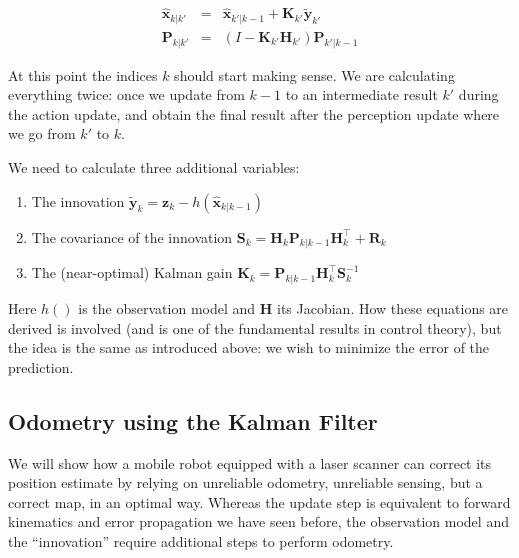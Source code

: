 \begin{eqnarray}
\hat{\boldsymbol{x}}_{k|k'} &=& \hat{\boldsymbol{x}}_{k'|k-1} + \boldsymbol{K}_{k'}\tilde{\boldsymbol{y}}_{k'}\\
\boldsymbol{P}_{k|k'} &=& (I - \boldsymbol{K}_{k'} {\boldsymbol{H}_{k'}}) \boldsymbol{P}_{k'|k-1}
\end{eqnarray}

At this point the indices $ k$ should start making sense. We are calculating everything twice: once we update from $ k-1$ to an intermediate result $ k'$ during the action update, and obtain the final result after the perception update where we go from $ k'$ to $ k$.

We need to calculate three additional variables:
\begin{enumerate}
\item The innovation $ \tilde{\boldsymbol{y}}_{k}=\boldsymbol{z}_{k}-h(\hat{\boldsymbol{x}}_{k|k-1})$
\item The covariance of the innovation $\boldsymbol{S}_{k}={\boldsymbol{H}_{k}}\boldsymbol{P}_{k|k-1}{\boldsymbol{H}_{k}^\top}+\boldsymbol{R}_{k}$
\item The (near-optimal)  Kalman gain $ \boldsymbol{K}_{k}=\boldsymbol{P}_{k|k-1}{\boldsymbol{H}_{k}^\top}\boldsymbol{S}_{k}^{-1}$
\end{enumerate}
Here $ h()$ is the observation model and $ \boldsymbol{H}$ its Jacobian. How these equations are derived is involved (and is one of the fundamental results in control theory), but the idea is the same as introduced above: we wish to minimize the error of the prediction.

\subsection{Odometry using the Kalman Filter}
We will show how a mobile robot equipped with a laser scanner can correct its position estimate by relying on unreliable odometry, unreliable sensing, but a correct map, in an optimal way.
Whereas the update step is equivalent to forward kinematics and error propagation we have seen before, the observation model and the ``innovation'' require additional steps to perform odometry.

